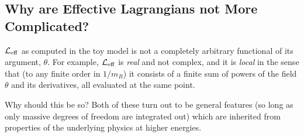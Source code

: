 \documentclass[12pt]{article}
\def\sst{\scriptscriptstyle}
\begin{document}
\subsection{Why are Effective Lagrangians not More Complicated?}

${\cal L}_{\rm eff}$ as computed in the toy model is
not a completely arbitrary functional of its argument, $\theta$.
For example, ${\cal L}_{\rm eff}$ is {\sl real} and not
complex, and it is {\sl local} in the sense that 
(to any finite order in $1/m_{\sst R}$) 
it consists of a finite sum of powers of the field $\theta$
and its derivatives, all evaluated at the same point. 

Why should this be so?
Both of these turn out to be general features (so long as 
only massive degrees of freedom are integrated out) which
are inherited from properties of the underlying physics at
higher energies. 
\end{document}
